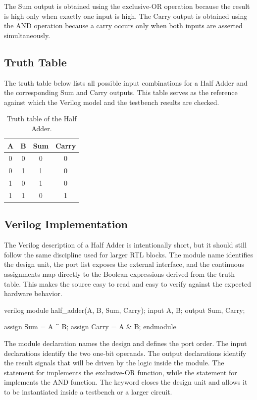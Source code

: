 \noindent The Sum output is obtained using the exclusive-OR operation because the result is high
only when exactly one input is high. The Carry output is obtained using the AND operation because a
carry occurs only when both inputs are asserted simultaneously.


\subsection{Truth Table}
The truth table below lists all possible input combinations for a Half Adder and the corresponding
Sum and Carry outputs. This table serves as the reference against which the Verilog model and the
testbench results are checked.

\begin{table}[H]
\centering
\renewcommand{\arraystretch}{1.2}
\begin{tabular}{|c|c|c|c|}
\hline
\textbf{A} & \textbf{B} & \textbf{Sum} & \textbf{Carry} \\
\hline
0 & 0 & 0 & 0 \\
\hline
0 & 1 & 1 & 0 \\
\hline
1 & 0 & 1 & 0 \\
\hline
1 & 1 & 0 & 1 \\
\hline
\end{tabular}
\caption{Truth table of the Half Adder.}
\label{tab:half_adder_truth}
\end{table}

\subsection{Verilog Implementation}
The Verilog description of a Half Adder is intentionally short, but it should still follow the same
discipline used for larger RTL blocks. The module name identifies the design unit, the port list
exposes the external interface, and the continuous assignments map directly to the Boolean
expressions derived from the truth table. This makes the source easy to read and easy to verify
against the expected hardware behavior.\\

\begin{codeblock}{verilog}
module half_adder(A, B, Sum, Carry);
    input A, B;
    output Sum, Carry;

    assign Sum = A ^ B;
    assign Carry = A & B;
endmodule
\end{codeblock}

\noindent The module declaration names the design and defines the port order. The input declarations
identify the two one-bit operands. The output declarations identify the result signals that will be
driven by the logic inside the module. The  statement for 
implements the exclusive-OR function, while the  statement for 
implements the AND function. The  keyword closes the design unit and allows it
to be instantiated inside a testbench or a larger circuit.

